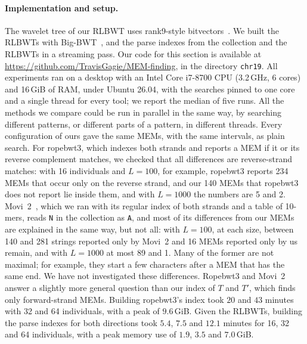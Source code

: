 \paragraph*{Implementation and setup.}
The wavelet tree of our RLBWT uses rank9-style
bitvectors~\cite{Vigna2008}. We
built the RLBWTs with Big-BWT~\cite{BoucherEtAl2019}, and the parse
indexes from the collection and the RLBWTs in a streaming pass.
Our code for this section is available at
\url{https://github.com/TravisGagie/MEM-finding}, in the directory \texttt{chr19}. All experiments ran
on a desktop with an Intel Core i7-8700 CPU (3.2\,GHz, 6 cores) and 16\,GiB of RAM, under Ubuntu 26.04, with
the searches pinned to one core and a single thread for every tool; we
report the median of five runs. All the methods we compare could be run
in parallel in the same way, by searching different patterns, or
different parts of a pattern, in different threads. Every configuration of ours gave the
same MEMs, with the same intervals, as plain search. For ropebwt3, which
indexes both strands and reports a MEM if it or its reverse complement
matches, we checked that all differences are reverse-strand matches:
with 16 individuals and $L = 100$, for example, ropebwt3 reports 234
MEMs that occur only on the reverse strand, and our 140 MEMs that
ropebwt3 does not report lie inside them, and with $L = 1000$ the
numbers are 5 and 2. Movi~2~\cite{ZakeriEtAl2026}, which we ran with
its regular index of both strands and a table of 10-mers, reads
\texttt{N} in the collection as \texttt{A}, and most of its differences
from our MEMs are explained in the same way, but not all: with
$L = 100$, at each size, between 140 and 281 strings reported only by
Movi~2 and 16 MEMs reported only by us remain, and with $L = 1000$ at
most 89 and 1. Many of the former are not maximal; for example, they
start a few characters after a MEM that has the same end. We have not
investigated these differences.
Ropebwt3 and Movi~2 answer a slightly more general question than our
index of $T$ and $T'$, which finds only forward-strand MEMs. Building
ropebwt3's index took $20$ and $43$ minutes with 32 and 64 individuals,
with a peak of $9.6$\,GiB.
Given the RLBWTs, building the parse indexes for both directions took
$5.4$, $7.5$ and $12.1$ minutes for 16, 32 and 64 individuals, with a
peak memory use of $1.9$, $3.5$ and $7.0$\,GiB.

